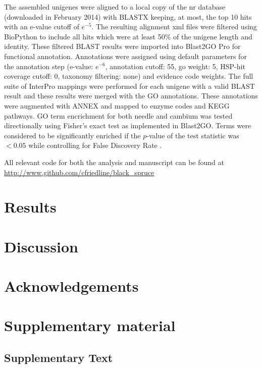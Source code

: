 \documentclass[11pt]{article}
\newcommand{\beginsupplement}{%
        \setcounter{table}{0}
        \renewcommand{\thetable}{S\arabic{table}}
        \setcounter{figure}{0}
        \renewcommand{\thefigure}{S\arabic{figure}}
        \renewcommand{\thesection}{S\arabic{section}}
        \renewcommand{\thesubsection}{S\arabic{subsection}} 
     }
\begin{document}
The assembled unigenes were aligned to a local copy of the nr database
(downloaded in February 2014) with BLASTX \citep{citeulike:238188}
keeping, at most, the top 10 hits with an e-value cutoff of
$e^{-5}$. The resulting alignment xml files were filtered using
BioPython \citep[v.\ 1.6.4]{citeulike:4202607} to include all hits
which were at least 50\% of the unigene length and identity.  These
filtered BLAST results were imported into Blast2GO Pro \citep[v.\
2.7.2, bg2\_may14]{citeulike:2733895} for functional annotation.
Annotations were assigned using default parameters for the annotation
step (e-value: $e^{-6}$, annotation cutoff: 55, go weight: 5, HSP-hit
coverage cutoff: 0, taxonomy filtering: none) and evidence code
weights. The full suite of InterPro \citep{citeulike:12942060}
mappings were performed for each unigene with a valid BLAST result and
these results were merged with the GO annotations.  These annotations
were augmented with ANNEX \citep{annex} and mapped to enzyme codes and
KEGG \citep{citeulike:9172127} pathways. GO term encrichment for both
needle and cambium was tested directionally using Fisher's exact test
as implemented in Blast2GO.  Terms were considered to be significantly
enriched if the $p$-value of the test statistic was $<0.05$ while
controlling for False Discovery Rate
\citep[FDR,][]{benjamini1995controlling}.

All relevant code for both the analysis and manuscript can be found at 
\url{http://www.github.com/cfriedline/black_spruce}

\section*{Results}

\section*{Discussion}

\section*{Acknowledgements}

\clearpage

\singlespacing



\clearpage

\clearpage

\clearpage

\beginsupplement

\section*{Supplementary material}

\subsection*{Supplementary Text}\label{ss:supp}
\end{document}
